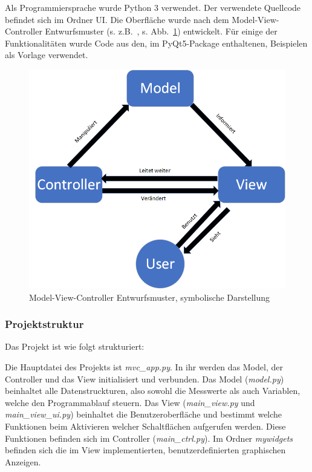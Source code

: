 Als Programmiersprache wurde Python 3 verwendet. Der verwendete Quellcode befindet sich im Ordner \textrm{UI}. Die Oberfläche wurde nach dem Model-View-Controller Entwurfsmuster (s. z.B.~\cite{deacon09}, s. Abb.~\ref{fig:ui_mvc}) entwickelt. Für einige der Funktionalitäten wurde Code aus den, im PyQt5-Package enthaltenen, Beispielen als Vorlage verwendet.
  \begin{figure}[H]
    \centering \includegraphics[width=\textwidth]{./img/MVC.png}
  \caption{Model-View-Controller Entwurfsmuster, symbolische Darstellung}\label{fig:ui_mvc}    
\end{figure}
\newpage
\subsubsection*{Projektstruktur}
Das Projekt ist wie folgt strukturiert:

Die Hauptdatei des Projekts ist \emph{mvc\_app.py}. In ihr werden das Model, der Controller und das View initialisiert und verbunden. Das Model (\emph{model.py}) beinhaltet alle Datenstruckturen, also sowohl die Messwerte als auch Variablen, welche den Programmablauf steuern. Das View (\emph{main\_view.py} und \emph{main\_view\_ui.py}) beinhaltet die Benutzeroberfläche und bestimmt welche Funktionen beim Aktivieren welcher Schaltflächen aufgerufen werden. Diese Funktionen befinden sich im Controller (\emph{main\_ctrl.py}). Im Ordner \emph{mywidgets} befinden sich die im View implementierten, benutzerdefinierten graphischen Anzeigen.

